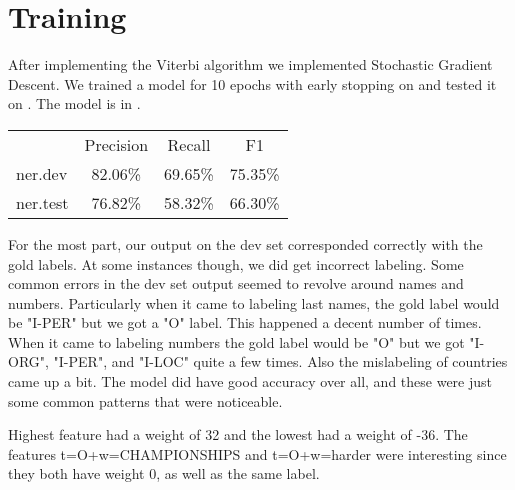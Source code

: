 \documentclass[12pt,notitlepage]{article}
\begin{document}
\section{Training}
After implementing the Viterbi algorithm we implemented Stochastic Gradient Descent. We trained a model for 10 epochs with early stopping on  and tested it on . The model is in .

\begin{table}[H]
\begin{center}
	\begin{tabular}{lccc}
		\multicolumn{1}{l}{}
		& \multicolumn{1}{c}{Precision}
		& \multicolumn{1}{c}{Recall}
		& \multicolumn{1}{c}{F1} \\
		\cline{2-4}
		\multicolumn{1}{l}{ner.dev}
		& \multicolumn{1}{|c}{82.06\%}
		& \multicolumn{1}{|c}{69.65\%}
		& \multicolumn{1}{|c|}{75.35\%} \\
		\cline{2-4}
		\multicolumn{1}{l}{ner.test}
		& \multicolumn{1}{|c}{76.82\%}
		& \multicolumn{1}{|c}{58.32\%}
		& \multicolumn{1}{|c|}{66.30\%} \\
		\cline{2-4}
	\end{tabular}
\end{center}
\end{table}
For the most part, our output on the dev set corresponded correctly with the gold labels. At some instances though, we did get incorrect labeling. Some common errors in the dev set output seemed to revolve around names and numbers. Particularly when it came to labeling last names, the gold label would be "I-PER" but we got a "O" label. This happened a decent number of times. When it came to labeling numbers the gold label would be "O" but we got "I-ORG", "I-PER", and "I-LOC"  quite a few times. Also the mislabeling of countries came up a bit. The model did have good accuracy over all, and these were just some common patterns that were noticeable.  

Highest feature had a weight of 32 and the lowest had a weight of -36. 
The features t=O+w=CHAMPIONSHIPS and t=O+w=harder were interesting since they both have weight 0, as well as the same label.
\end{document}
